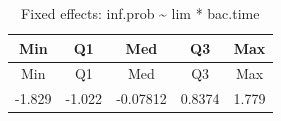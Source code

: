 \documentclass[]{article}
\begin{document}
\begin{longtable}[]{@{}ccccc@{}}
\caption{Fixed effects: inf.prob \textasciitilde{} lim *
bac.time}\tabularnewline
\toprule
\begin{minipage}[b]{0.08\columnwidth}\centering\strut
Min\strut
\end{minipage} & \begin{minipage}[b]{0.08\columnwidth}\centering\strut
Q1\strut
\end{minipage} & \begin{minipage}[b]{0.11\columnwidth}\centering\strut
Med\strut
\end{minipage} & \begin{minipage}[b]{0.08\columnwidth}\centering\strut
Q3\strut
\end{minipage} & \begin{minipage}[b]{0.08\columnwidth}\centering\strut
Max\strut
\end{minipage}\tabularnewline
\midrule
\endfirsthead
\toprule
\begin{minipage}[b]{0.08\columnwidth}\centering\strut
Min\strut
\end{minipage} & \begin{minipage}[b]{0.08\columnwidth}\centering\strut
Q1\strut
\end{minipage} & \begin{minipage}[b]{0.11\columnwidth}\centering\strut
Med\strut
\end{minipage} & \begin{minipage}[b]{0.08\columnwidth}\centering\strut
Q3\strut
\end{minipage} & \begin{minipage}[b]{0.08\columnwidth}\centering\strut
Max\strut
\end{minipage}\tabularnewline
\midrule
\endhead
\begin{minipage}[t]{0.08\columnwidth}\centering\strut
-1.829\strut
\end{minipage} & \begin{minipage}[t]{0.08\columnwidth}\centering\strut
-1.022\strut
\end{minipage} & \begin{minipage}[t]{0.11\columnwidth}\centering\strut
-0.07812\strut
\end{minipage} & \begin{minipage}[t]{0.08\columnwidth}\centering\strut
0.8374\strut
\end{minipage} & \begin{minipage}[t]{0.08\columnwidth}\centering\strut
1.779\strut
\end{minipage}\tabularnewline
\bottomrule
\end{longtable}
\end{document}
